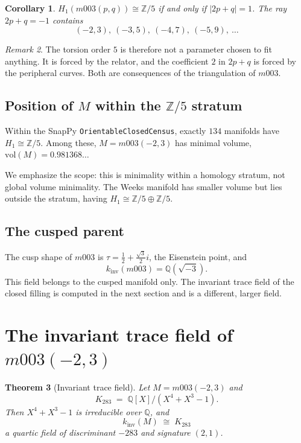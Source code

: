 \documentclass[11pt,a4paper]{article}
\newtheorem{theorem}{Theorem}[section]
\newtheorem{corollary}[theorem]{Corollary}
\theoremstyle{definition}
\theoremstyle{remark}
\newtheorem{remark}[theorem]{Remark}
\newcommand{\kinv}{k_{\mathrm{inv}}}
\newcommand{\Zfive}{\mathbb{Z}/5}
\newcommand{\Q}{\mathbb{Q}}
\begin{document}
\begin{corollary}
\label{cor:z5ray}
$H_1(m003(p,q)) \cong \Zfive$ if and only if $|2p+q| = 1$. The ray
$2p+q = -1$ contains
\begin{equation}
(-2,3),\ (-3,5),\ (-4,7),\ (-5,9),\ \ldots
\end{equation}
\end{corollary}

\begin{remark}
The torsion order $5$ is therefore not a parameter chosen to fit
anything. It is forced by the relator, and the coefficient $2$ in
$2p+q$ is forced by the peripheral curves. Both are consequences of
the triangulation of $m003$.
\end{remark}

\subsection{Position of $M$ within the $\Zfive$ stratum}

Within the SnapPy \texttt{OrientableClosedCensus}, exactly $134$
manifolds have $H_1 \cong \Zfive$. Among these, $M = m003(-2,3)$
has minimal volume, $\mathrm{vol}(M) = 0.981368\ldots$

We emphasize the scope: this is minimality within a homology stratum,
not global volume minimality. The Weeks manifold has smaller volume
but lies outside the stratum, having $H_1 \cong \Zfive \oplus \Zfive$.

\subsection{The cusped parent}

The cusp shape of $m003$ is $\tau = \tfrac12 + \tfrac{\sqrt3}{2} i$,
the Eisenstein point, and
\begin{equation}
\kinv(m003) = \Q(\sqrt{-3}).
\end{equation}
This field belongs to the cusped manifold only. The invariant trace
field of the closed filling is computed in the next section and is
a different, larger field.

\section{The invariant trace field of $m003(-2,3)$}
\label{sec:itf}

\begin{theorem}[Invariant trace field]
\label{thm:itf}
Let $M = m003(-2,3)$ and
\begin{equation}
K_{283} \;=\; \Q[X]/(X^4+X^3-1).
\end{equation}
Then $X^4+X^3-1$ is irreducible over $\Q$, and
\begin{equation}
\boxed{\;\kinv(M) \;\cong\; K_{283}\;}
\end{equation}
a quartic field of discriminant $-283$ and signature $(2,1)$.
\end{theorem}
\end{document}
